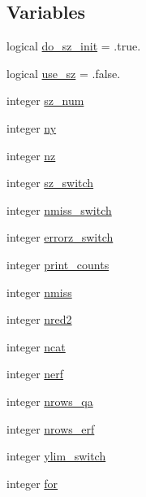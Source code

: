 \subsection*{Variables}
\begin{DoxyCompactItemize}
\item 
logical \mbox{\hyperlink{namespaceszcounts_a115079cdaf012d6e19dfcf1ef1d94de6}{do\+\_\+sz\+\_\+init}} = .true.
\item 
logical \mbox{\hyperlink{namespaceszcounts_ab9a32458d184b4ed56c53c9082c7c67a}{use\+\_\+sz}} = .false.
\item 
integer \mbox{\hyperlink{namespaceszcounts_aedc8585dbbc04a06f4913d1d15752108}{sz\+\_\+num}}
\item 
integer \mbox{\hyperlink{namespaceszcounts_a2c231e5f41215024e487ea111556280a}{ny}}
\item 
integer \mbox{\hyperlink{namespaceszcounts_a5b5fcdf2152c2af5169ef6293749f467}{nz}}
\item 
integer \mbox{\hyperlink{namespaceszcounts_a7cd38bc2def0a071d9d8ccf4de51fd98}{sz\+\_\+switch}}
\item 
integer \mbox{\hyperlink{namespaceszcounts_aeca7339cc77539d46b2ac1756c6eef3b}{nmiss\+\_\+switch}}
\item 
integer \mbox{\hyperlink{namespaceszcounts_a6def443ac3e0a9afd588d7251c768760}{errorz\+\_\+switch}}
\item 
integer \mbox{\hyperlink{namespaceszcounts_a89e748b08fe1c1bf0622bc36abb46e38}{print\+\_\+counts}}
\item 
integer \mbox{\hyperlink{namespaceszcounts_aec365ec73a0a61aac5c8f6b386972ae3}{nmiss}}
\item 
integer \mbox{\hyperlink{namespaceszcounts_a2918e9d37a3720ad5c9d793005f4c774}{nred2}}
\item 
integer \mbox{\hyperlink{namespaceszcounts_adbee780b7de47a7a0ed712ecf643edad}{ncat}}
\item 
integer \mbox{\hyperlink{namespaceszcounts_a0c42a07d181e073516184ad2778e1b0c}{nerf}}
\item 
integer \mbox{\hyperlink{namespaceszcounts_a1e708b5794db648704f60ff689180607}{nrows\+\_\+qa}}
\item 
integer \mbox{\hyperlink{namespaceszcounts_a439b480209d3bead1d0c7fdada2d2dda}{nrows\+\_\+erf}}
\item 
integer \mbox{\hyperlink{namespaceszcounts_ac9b32f7b1676215c63a305f4ad36ac0a}{ylim\+\_\+switch}}
\item 
integer \mbox{\hyperlink{namespaceszcounts_a27757054150c1df2c034d1404888b01d}{for}}

\end{DoxyCompactItemize}

